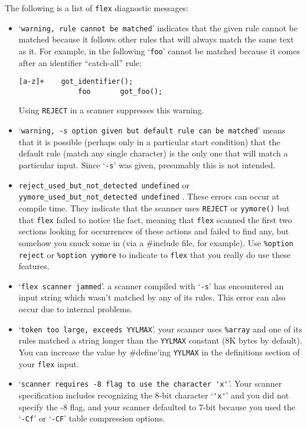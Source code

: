 \documentclass[openany,oneside]{book}
\begin{document}
The following is a list of \verb`flex` diagnostic messages:
\begin{itemize}
\item ‘\verb`warning, rule cannot be matched`’ indicates that the given rule
cannot be matched because it follows other rules that will always match
the same text as it.  For example, in the following ‘\verb`foo`’ cannot be
matched because it comes after an identifier “catch-all” rule:


\begin{verbatim}
[a-z]+    got_identifier();
              foo       got_foo();
\end{verbatim}


Using \verb`REJECT` in a scanner suppresses this warning.
\item ‘\verb`warning, -s option given but default rule can be matched`’ means
that it is possible (perhaps only in a particular start condition) that
the default rule (match any single character) is the only one that will
match a particular input.  Since ‘\verb`-s`’ was given, presumably this is
not intended.
\item  \verb`reject_used_but_not_detected undefined` or \verb`yymore_used_but_not_detected undefined` . These errors can occur
at compile time.  They indicate that the scanner uses \verb`REJECT` or \verb`yymore()` but that \verb`flex` failed to notice the fact, meaning
that \verb`flex` scanned the first two sections looking for occurrences
of these actions and failed to find any, but somehow you snuck some in
(via a \#{}include file, for example).  Use \verb`%option reject` or \verb`%option yymore` to indicate to \verb`flex` that you really do use
these features.
\item ‘\verb`flex scanner jammed`’. a scanner compiled with
‘\verb`-s`’ has encountered an input string which wasn't matched by any of
its rules.  This error can also occur due to internal problems.
\item ‘\verb`token too large, exceeds YYLMAX`’. your scanner uses \verb`%array` and one of its rules matched a string longer than the \verb`YYLMAX` constant (8K bytes by default).  You can increase the value by
\#{}define'ing \verb`YYLMAX` in the definitions section of your \verb`flex` input.
\item ‘\verb`scanner requires -8 flag to use the character 'x'`’. Your scanner
specification includes recognizing the 8-bit character ‘\verb`'x'`’ and
you did not specify the -8 flag, and your scanner defaulted to 7-bit
because you used the ‘\verb`-Cf`’ or ‘\verb`-CF`’ table compression options. 

\end{itemize}
\end{document}
